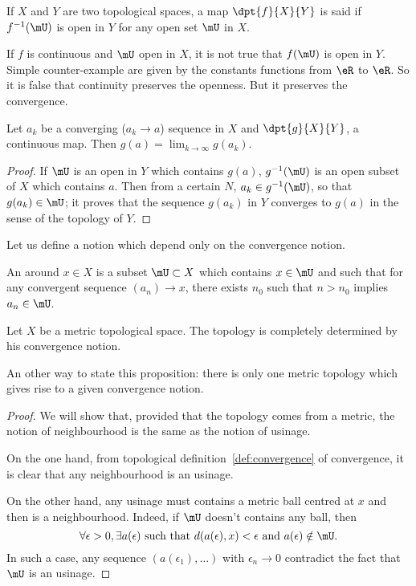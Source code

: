 \begin{definition}
	If $X$ and $Y$ are two topological spaces, a map $\dpt{f}{X}{Y}$ is said  if $f^{-1}(\mU)$ is open in $Y$ for any open set $\mU$ in $X$.
\end{definition}

If $f$ is continuous and $\mU$ open in $X$, it is not true that $f(\mU)$ is open in $Y$. Simple counter-example are given by the constants functions from $\eR$ to $\eR$. So it is false that continuity preserves the openness. But it preserves the convergence.

\begin{proposition}
	Let $a_k$ be a converging ($a_k\to a$) sequence in $X$ and $\dpt{g}{X}{Y}$, a continuous map. Then $g(a)=\lim_{k\to\infty}g(a_k)$.
	\label{prop:continu_cv}
\end{proposition}
\begin{proof}
	If $\mU$ is an open in $Y$ which contains $g(a)$, $g^{-1}(\mU)$ is an open subset of $X$ which contains $a$. Then from a certain $N$, $a_k\in g^{-1}(\mU)$, so that $g(a_k)\in\mU$; it proves that the sequence $g(a_k)$ in $Y$ converges to $g(a)$ in the sense of the topology of $Y$.
\end{proof}

Let us define a notion which depend only on the convergence notion.

\begin{definition}
	An  around $x\in X$ is a subset $\mU\subset X$ which contains $x\in\mU$ and such that for any convergent sequence $(a_n)\to x$, there exists $n_0$ such that $n>n_0$ implies $a_n\in\mU$.
\end{definition}

\begin{lemma}
	Let $X$ be a metric topological space. The topology is completely determined by his convergence notion.

	An other way to state this proposition: there is only one metric topology which gives rise to a given convergence notion. \label{prop:usinage}
\end{lemma}
\begin{proof}
	We will show that, provided that the topology comes from a metric, the notion of neighbourhood is the same as the notion of usinage.

	On the one hand, from topological definition~\ref{def:convergence} of convergence, it is clear that any neighbourhood is an usinage.

	On the other hand, any usinage must contains a metric ball centred at $x$ and then is a neighbourhood. Indeed, if $\mU$ doesn't contains any ball, then
	\[
		\forall\epsilon>0,\exists a(\epsilon)\text{ such that } d(a(\epsilon),x)<\epsilon \text{ and } a(\epsilon)\notin\mU.
	\]
	In such a case, any sequence $( a(\epsilon_1),\ldots )$ with $\epsilon_n\to 0$ contradict the fact that $\mU$ is an usinage.
\end{proof}

